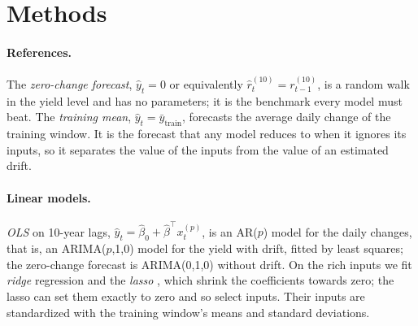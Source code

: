 \documentclass{article}
\begin{document}
\section{Methods}\label{sec:methods}
\paragraph{References.} The \emph{zero-change forecast}, $\widehat y_t = 0$ or equivalently $\widehat r^{(10)}_t = r^{(10)}_{t-1}$, is a random walk in the yield level and has no parameters; it is the benchmark every model must beat. The \emph{training mean}, $\widehat y_t = \bar y_{\text{train}}$, forecasts the average daily change of the training window. It is the forecast that any model reduces to when it ignores its inputs, so it separates the value of the inputs from the value of an estimated drift.

\paragraph{Linear models.} \emph{OLS} on 10-year lags, $\widehat y_t = \widehat\beta_0 + \widehat\beta^\top x_t^{(p)}$, is an AR($p$) model for the daily changes, that is, an ARIMA($p$,1,0) model for the yield with drift, fitted by least squares; the zero-change forecast is ARIMA(0,1,0) without drift. On the rich inputs we fit \emph{ridge} regression \citep{hoerl1970} and the \emph{lasso} \citep{tibshirani1996}, which shrink the coefficients towards zero; the lasso can set them exactly to zero and so select inputs. Their inputs are standardized with the training window's means and standard deviations.
\end{document}
